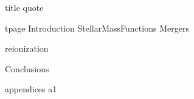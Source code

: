 
\usepackage{amssymb,amsmath,amsfonts}
\usepackage{mathrsfs}
\usepackage{graphicx}
\usepackage{pdflscape}
\usepackage{color}

\usepackage[super]{nth}




{title}                    %
{quote}       %
\dsp                                            %

\ssp                                            %
\tableofcontents                                %
\newpage                                        %
\listoffigures                                  %
\newpage                                        %
\listoftables                                   %
\newpage

\dsp                                            %
{tpage}                    %
\newpage
{Introduction}               %
{StellarMassFunctions}               %
{Mergers}               %

{reionization}               %

{Conclusions}

\appendix
{appendices}               %
\newpage
{a1}                  %

\newpage
\ssp                                            %

\ssp



